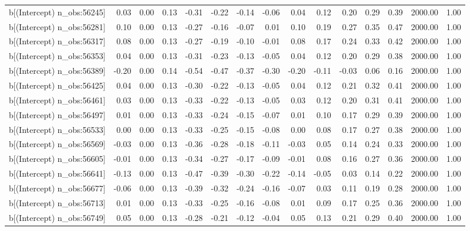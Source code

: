 \begin{table}[ht]
\begin{tabular}{rrrrrrrrrrrrrrr}
  b[(Intercept) n\_obs:56245] & 0.03 & 0.00 & 0.13 & -0.31 & -0.22 & -0.14 & -0.06 & 0.04 & 0.12 & 0.20 & 0.29 & 0.39 & 2000.00 & 1.00 \\ 
  b[(Intercept) n\_obs:56281] & 0.10 & 0.00 & 0.13 & -0.27 & -0.16 & -0.07 & 0.01 & 0.10 & 0.19 & 0.27 & 0.35 & 0.47 & 2000.00 & 1.00 \\ 
  b[(Intercept) n\_obs:56317] & 0.08 & 0.00 & 0.13 & -0.27 & -0.19 & -0.10 & -0.01 & 0.08 & 0.17 & 0.24 & 0.33 & 0.42 & 2000.00 & 1.00 \\ 
  b[(Intercept) n\_obs:56353] & 0.04 & 0.00 & 0.13 & -0.31 & -0.23 & -0.13 & -0.05 & 0.04 & 0.12 & 0.20 & 0.29 & 0.38 & 2000.00 & 1.00 \\ 
  b[(Intercept) n\_obs:56389] & -0.20 & 0.00 & 0.14 & -0.54 & -0.47 & -0.37 & -0.30 & -0.20 & -0.11 & -0.03 & 0.06 & 0.16 & 2000.00 & 1.00 \\ 
  b[(Intercept) n\_obs:56425] & 0.04 & 0.00 & 0.13 & -0.30 & -0.22 & -0.13 & -0.05 & 0.04 & 0.12 & 0.21 & 0.32 & 0.41 & 2000.00 & 1.00 \\ 
  b[(Intercept) n\_obs:56461] & 0.03 & 0.00 & 0.13 & -0.33 & -0.22 & -0.13 & -0.05 & 0.03 & 0.12 & 0.20 & 0.31 & 0.41 & 2000.00 & 1.00 \\ 
  b[(Intercept) n\_obs:56497] & 0.01 & 0.00 & 0.13 & -0.33 & -0.24 & -0.15 & -0.07 & 0.01 & 0.10 & 0.17 & 0.29 & 0.39 & 2000.00 & 1.00 \\ 
  b[(Intercept) n\_obs:56533] & 0.00 & 0.00 & 0.13 & -0.33 & -0.25 & -0.15 & -0.08 & 0.00 & 0.08 & 0.17 & 0.27 & 0.38 & 2000.00 & 1.00 \\ 
  b[(Intercept) n\_obs:56569] & -0.03 & 0.00 & 0.13 & -0.36 & -0.28 & -0.18 & -0.11 & -0.03 & 0.05 & 0.14 & 0.24 & 0.33 & 2000.00 & 1.00 \\ 
  b[(Intercept) n\_obs:56605] & -0.01 & 0.00 & 0.13 & -0.34 & -0.27 & -0.17 & -0.09 & -0.01 & 0.08 & 0.16 & 0.27 & 0.36 & 2000.00 & 1.00 \\ 
  b[(Intercept) n\_obs:56641] & -0.13 & 0.00 & 0.13 & -0.47 & -0.39 & -0.30 & -0.22 & -0.14 & -0.05 & 0.03 & 0.14 & 0.22 & 2000.00 & 1.00 \\ 
  b[(Intercept) n\_obs:56677] & -0.06 & 0.00 & 0.13 & -0.39 & -0.32 & -0.24 & -0.16 & -0.07 & 0.03 & 0.11 & 0.19 & 0.28 & 2000.00 & 1.00 \\ 
  b[(Intercept) n\_obs:56713] & 0.01 & 0.00 & 0.13 & -0.33 & -0.25 & -0.16 & -0.08 & 0.01 & 0.09 & 0.17 & 0.25 & 0.36 & 2000.00 & 1.00 \\ 
  b[(Intercept) n\_obs:56749] & 0.05 & 0.00 & 0.13 & -0.28 & -0.21 & -0.12 & -0.04 & 0.05 & 0.13 & 0.21 & 0.29 & 0.40 & 2000.00 & 1.00 \\ 

\end{tabular}
\end{table}
